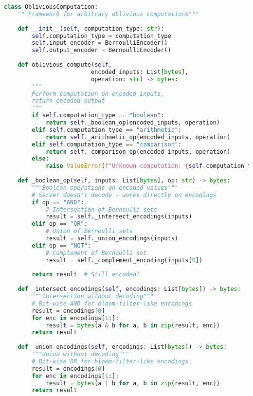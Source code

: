 \begin{lstlisting}[language=Python, caption={Oblivious computation framework}]
class ObliviousComputation:
    """Framework for arbitrary oblivious computations"""
    
    def __init__(self, computation_type: str):
        self.computation_type = computation_type
        self.input_encoder = BernoulliEncoder()
        self.output_encoder = BernoulliEncoder()
        
    def oblivious_compute(self, 
                         encoded_inputs: List[bytes], 
                         operation: str) -> bytes:
        """
        Perform computation on encoded inputs,
        return encoded output
        """
        if self.computation_type == "boolean":
            return self._boolean_op(encoded_inputs, operation)
        elif self.computation_type == "arithmetic":
            return self._arithmetic_op(encoded_inputs, operation)
        elif self.computation_type == "comparison":
            return self._comparison_op(encoded_inputs, operation)
        else:
            raise ValueError(f"Unknown computation: {self.computation_type}")
    
    def _boolean_op(self, inputs: List[bytes], op: str) -> bytes:
        """Boolean operations on encoded values"""
        # Server doesn't decode - works directly on encodings
        if op == "AND":
            # Intersection of Bernoulli sets
            result = self._intersect_encodings(inputs)
        elif op == "OR":
            # Union of Bernoulli sets
            result = self._union_encodings(inputs)
        elif op == "NOT":
            # Complement of Bernoulli set
            result = self._complement_encoding(inputs[0])
        
        return result  # Still encoded!
    
    def _intersect_encodings(self, encodings: List[bytes]) -> bytes:
        """Intersection without decoding"""
        # Bit-wise AND for bloom-filter-like encodings
        result = encodings[0]
        for enc in encodings[1:]:
            result = bytes(a & b for a, b in zip(result, enc))
        return result
    
    def _union_encodings(self, encodings: List[bytes]) -> bytes:
        """Union without decoding"""
        # Bit-wise OR for bloom-filter-like encodings
        result = encodings[0]
        for enc in encodings[1:]:
            result = bytes(a | b for a, b in zip(result, enc))
        return result
\end{lstlisting}

